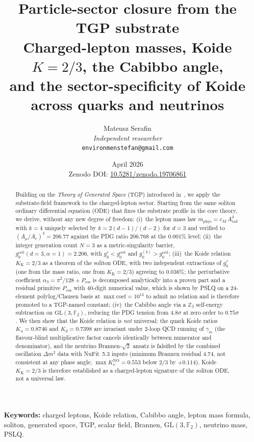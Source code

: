 \documentclass[11pt,a4paper]{article}
\title{%
  \textbf{Particle-sector closure from the TGP substrate}\\[4pt]
  \large Charged-lepton masses, Koide $K=2/3$, the Cabibbo angle,\\
  \large and the sector-specificity of Koide across quarks and neutrinos%
}
\author{Mateusz Serafin\\[2pt]
\small\textit{Independent researcher}\\[-2pt]
\small\texttt{environmenstefan@gmail.com}}
\date{April 2026\\[4pt]
\small Zenodo DOI:
\href{https://doi.org/10.5281/zenodo.19706861}{10.5281/zenodo.19706861}}
\newcommand{\Atail}{A_{\mathrm{tail}}}
\newcommand{\mphys}{m_{\mathrm{phys}}}
\newcommand{\gcrit}{g_{0}^{\mathrm{crit}}}
\newcommand{\Kkoide}{K_{\mathrm{K}}}
\newcommand{\Pcos}{P_{\cos}}
\newcommand{\GLtf}{\mathrm{GL}(3,\mathbb{F}_{2})}
\newcommand{\Zthree}{\mathbb{Z}_{3}}
\begin{document}
\maketitle

\begin{abstract}
Building on the \emph{Theory of Generated Space} (TGP) introduced
in~\cite{TGP-core}, we apply the substrate-field framework to the
charged-lepton sector. Starting from the same soliton ordinary
differential equation (ODE) that fixes the substrate profile in the
core theory, we derive, without any new degree of freedom:
(i)~the lepton mass law $\mphys = c_{M}\,\Atail^{4}$ with $k=4$ uniquely
selected by $k = 2(d-1)/(d-2)$ for $d=3$ and verified to
$(A_{\mu}/A_{e})^{4}=206.77$ against the PDG ratio $206.768$ at the
$0.001\%$ level;
(ii)~the integer generation count $N=3$ as a metric-singularity barrier,
$\gcrit(d=3,\alpha=1)=2.206$, with $g_{0}^{\tau}<\gcrit$ and
$g_{0}^{(4)}>\gcrit$;
(iii)~the Koide relation $\Kkoide=2/3$ as a theorem of the soliton ODE,
with two independent extractions of $g_{0}^{\tau}$ (one from the
mass ratio, one from $\Kkoide=2/3$) agreeing to $0.036\%$; the
perturbative coefficient $\alpha_{3}=\pi^{2}/128+\Pcos$ is decomposed
analytically into a proven part and a residual primitive $\Pcos$ with
$40$-digit numerical value, which is shown by PSLQ on a $24$-element
polylog/Clausen basis at $\max\text{coef}=10^{14}$ to admit no relation
and is therefore promoted to a TGP-named constant;
(iv)~the Cabibbo angle via a $\Zthree$ self-energy subtraction on
$\GLtf$, reducing the PDG tension from $4.8\sigma$ at zero order to
$0.75\sigma$.
We then show that the Koide relation is \emph{not} universal: the
quark Koide ratios $K_{u}=0.8746$ and $K_{d}=0.7398$ are invariant under
2-loop QCD running of $\gamma_{m}$ (the flavour-blind multiplicative
factor cancels identically between numerator and denominator), and the
neutrino Brannen-$\sqrt{2}$ ansatz is falsified by the combined
oscillation $\Delta m^{2}$ data with NuFit~5.3 inputs (minimum Brannen
residual $4.74$, not consistent at any phase angle; $\max
K_{\nu}^{\mathrm{NO}}=0.553$ below $2/3$ by $+0.114$). Koide $\Kkoide=2/3$
is therefore established as a charged-lepton signature of the
soliton ODE, not a universal law.
\end{abstract}

\noindent\textbf{Keywords:}
charged leptons, Koide relation, Cabibbo angle, lepton mass formula,
soliton, generated space, TGP, scalar field, Brannen, $\GLtf$,
neutrino mass, PSLQ.
\end{document}
